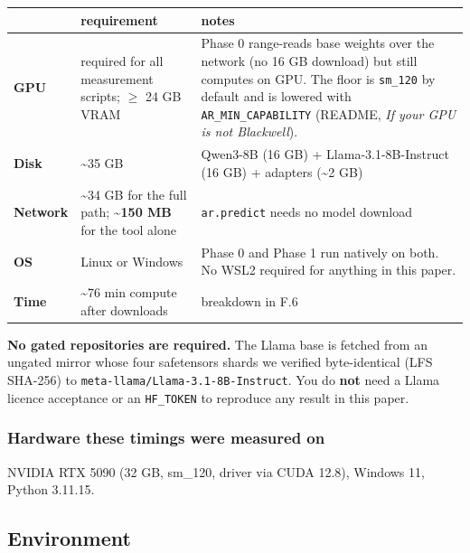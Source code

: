 \begin{table}[t]
\centering\scriptsize
\begin{tabularx}{\textwidth}{l>{\hsize=0.440\hsize\raggedright\arraybackslash}X>{\hsize=1.560\hsize\raggedright\arraybackslash}X}
\toprule
 & requirement & notes \\
\midrule
\textbf{GPU} & required for all measurement scripts; $\geq$ 24 GB VRAM & Phase 0 range-reads base weights over the network (no 16 GB download) but still computes on GPU. The floor is \texttt{sm\_\allowbreak{}120} by default and is lowered with \texttt{AR\_\allowbreak{}MIN\_\allowbreak{}CAPABILITY} (README, \emph{If your GPU is not Blackwell}). \\
\textbf{Disk} & \textasciitilde{}35 GB & Qwen3-8B (16 GB) + Llama-3.1-8B-Instruct (16 GB) + adapters (\textasciitilde{}2 GB) \\
\textbf{Network} & \textasciitilde{}34 GB for the full path; \textbf{\textasciitilde{}150 MB} for the tool alone & \texttt{ar.\allowbreak{}predict} needs no model download \\
\textbf{OS} & Linux or Windows & Phase 0 and Phase 1 run natively on both. No WSL2 required for anything in this paper. \\
\textbf{Time} & \textasciitilde{}76 min compute after downloads & breakdown in F.6 \\
\bottomrule
\end{tabularx}
\end{table}

\textbf{No gated repositories are required.} The Llama base is fetched from an ungated mirror whose four safetensors shards we verified byte-identical (LFS SHA-256) to \texttt{meta-\allowbreak{}llama/\allowbreak{}Llama-\allowbreak{}3.\allowbreak{}1-\allowbreak{}8B-\allowbreak{}Instruct}. You do \textbf{not} need a Llama licence acceptance or an \texttt{HF\_\allowbreak{}TOKEN} to reproduce any result in this paper.

\subsubsection{Hardware these timings were measured on}

NVIDIA RTX 5090 (32 GB, sm\_120, driver via CUDA 12.8), Windows 11, Python 3.11.15.

\subsection{Environment}

